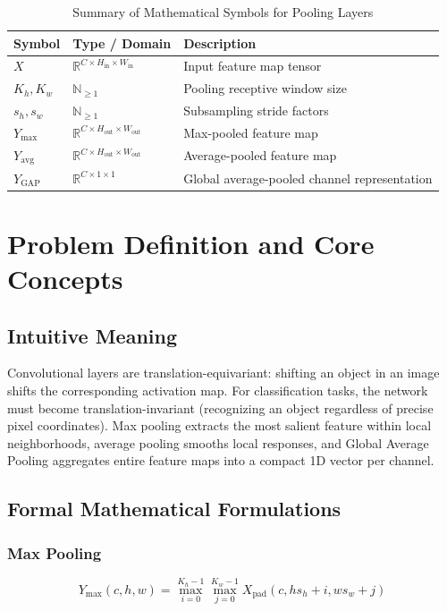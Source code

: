 \documentclass[11pt,a4paper]{article}
\theoremstyle{definition}
\begin{document}
\begin{table}[h]
\centering
\caption{Summary of Mathematical Symbols for Pooling Layers}
\begin{tabular}{lll}
\toprule
\textbf{Symbol} & \textbf{Type / Domain} & \textbf{Description} \\
\midrule
$X$ & $\mathbb{R}^{C \times H_{\text{in}} \times W_{\text{in}}}$ & Input feature map tensor \\
$K_h, K_w$ & $\mathbb{N}_{\ge 1}$ & Pooling receptive window size \\
$s_h, s_w$ & $\mathbb{N}_{\ge 1}$ & Subsampling stride factors \\
$Y_{\text{max}}$ & $\mathbb{R}^{C \times H_{\text{out}} \times W_{\text{out}}}$ & Max-pooled feature map \\
$Y_{\text{avg}}$ & $\mathbb{R}^{C \times H_{\text{out}} \times W_{\text{out}}}$ & Average-pooled feature map \\
$Y_{\text{GAP}}$ & $\mathbb{R}^{C \times 1 \times 1}$ & Global average-pooled channel representation \\
\bottomrule
\end{tabular}
\end{table}

\section{Problem Definition and Core Concepts}

\subsection{Intuitive Meaning}
Convolutional layers are translation-equivariant: shifting an object in an image shifts the corresponding activation map. For classification tasks, the network must become translation-invariant (recognizing an object regardless of precise pixel coordinates). Max pooling extracts the most salient feature within local neighborhoods, average pooling smooths local responses, and Global Average Pooling aggregates entire feature maps into a compact 1D vector per channel.

\subsection{Formal Mathematical Formulations}

\subsubsection{Max Pooling}
\begin{equation}
Y_{\text{max}}(c, h, w) = \max_{i=0}^{K_h-1} \max_{j=0}^{K_w-1} X_{\text{pad}}(c, h s_h + i, w s_w + j)
\end{equation}
\end{document}
